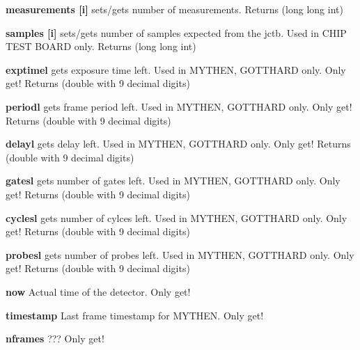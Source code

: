 \begin{DoxyItemize}
\item {\bfseries measurements \mbox{[}i\mbox{]}} sets/gets number of measurements. {\ttfamily Returns} {\ttfamily }(long long int)
\end{DoxyItemize}


\begin{DoxyItemize}
\item {\bfseries samples \mbox{[}i\mbox{]}} sets/gets number of samples expected from the jctb. Used in CHIP TEST BOARD only. {\ttfamily Returns} {\ttfamily }(long long int)
\end{DoxyItemize}


\begin{DoxyItemize}
\item {\bfseries exptimel} gets exposure time left. Used in MYTHEN, GOTTHARD only. Only get! {\ttfamily Returns} {\ttfamily }(double with 9 decimal digits)
\end{DoxyItemize}


\begin{DoxyItemize}
\item {\bfseries periodl} gets frame period left. Used in MYTHEN, GOTTHARD only. Only get! {\ttfamily Returns} {\ttfamily }(double with 9 decimal digits)
\end{DoxyItemize}


\begin{DoxyItemize}
\item {\bfseries delayl} gets delay left. Used in MYTHEN, GOTTHARD only. Only get! {\ttfamily Returns} {\ttfamily }(double with 9 decimal digits)
\end{DoxyItemize}


\begin{DoxyItemize}
\item {\bfseries gatesl} gets number of gates left. Used in MYTHEN, GOTTHARD only. Only get! {\ttfamily Returns} {\ttfamily }(double with 9 decimal digits)
\end{DoxyItemize}


\begin{DoxyItemize}
\item {\bfseries cyclesl} gets number of cylces left. Used in MYTHEN, GOTTHARD only. Only get! {\ttfamily Returns} {\ttfamily }(double with 9 decimal digits)
\end{DoxyItemize}


\begin{DoxyItemize}
\item {\bfseries probesl} gets number of probes left. Used in MYTHEN, GOTTHARD only. Only get! {\ttfamily Returns} {\ttfamily }(double with 9 decimal digits)
\end{DoxyItemize}


\begin{DoxyItemize}
\item {\bfseries now} Actual time of the detector. Only get!
\end{DoxyItemize}


\begin{DoxyItemize}
\item {\bfseries timestamp} Last frame timestamp for MYTHEN. Only get!
\end{DoxyItemize}


\begin{DoxyItemize}
\item {\bfseries nframes} ??? Only get! 
\end{DoxyItemize}